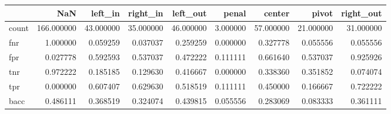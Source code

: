 \begin{tabular}{lrrrrrrrr}
\toprule
{} &         NaN &    left\_in &   right\_in &   left\_out &     penal &     center &      pivot &  right\_out \\
\midrule
count &  166.000000 &  43.000000 &  35.000000 &  46.000000 &  3.000000 &  57.000000 &  21.000000 &  31.000000 \\
fnr   &    1.000000 &   0.059259 &   0.037037 &   0.259259 &  0.000000 &   0.327778 &   0.055556 &   0.055556 \\
fpr   &    0.027778 &   0.592593 &   0.537037 &   0.472222 &  0.111111 &   0.661640 &   0.537037 &   0.925926 \\
tnr   &    0.972222 &   0.185185 &   0.129630 &   0.416667 &  0.000000 &   0.338360 &   0.351852 &   0.074074 \\
tpr   &    0.000000 &   0.607407 &   0.629630 &   0.518519 &  0.111111 &   0.450000 &   0.166667 &   0.722222 \\
bacc  &    0.486111 &   0.368519 &   0.324074 &   0.439815 &  0.055556 &   0.283069 &   0.083333 &   0.361111 \\
\bottomrule
\end{tabular}
